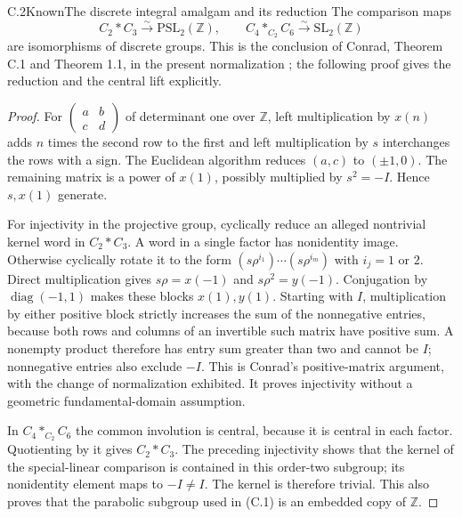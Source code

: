 \begin{statement}{C.2}{Known}{The discrete integral amalgam and its reduction}
The comparison maps
\[
 C_2*C_3\xrightarrow{\sim}\mathrm{PSL}_2(\mathbb Z),\qquad
 C_4*_{C_2}C_6\xrightarrow{\sim}\mathrm{SL}_2(\mathbb Z)
\]
are isomorphisms of discrete groups. This is the conclusion of Conrad,
Theorem C.1 and Theorem 1.1, in the present normalization
\cite{ConradSL2Z}; the following proof gives the reduction and the
central lift explicitly.
\end{statement}
\begin{proof}
For $\left(\begin{smallmatrix}a&b\\c&d\end{smallmatrix}\right)$ of
determinant one over $\mathbb Z$, left multiplication by $x(n)$ adds
$n$ times the second row to the first and left multiplication by $s$
interchanges the rows with a sign. The Euclidean algorithm reduces
$(a,c)$ to $(\pm1,0)$. The remaining matrix is a power of $x(1)$,
possibly multiplied by $s^2=-I$. Hence $s,x(1)$ generate.

For injectivity in the projective group, cyclically reduce an alleged
nontrivial kernel word in $C_2*C_3$. A word in a single factor has
nonidentity image. Otherwise cyclically rotate it to the form
$(s\rho^{i_1})\cdots(s\rho^{i_m})$ with $i_j=1$ or $2$.
Direct multiplication gives $s\rho=x(-1)$ and $s\rho^2=y(-1)$.
Conjugation by $\operatorname{diag}(-1,1)$ makes these blocks
$x(1),y(1)$. Starting with $I$, multiplication by either positive
block strictly increases the sum of the nonnegative entries, because
both rows and columns of an invertible such matrix have positive sum.
A nonempty product therefore has entry sum greater than two and
cannot be $I$; nonnegative entries also exclude $-I$.
This is Conrad's positive-matrix argument, with the change of
normalization exhibited. It proves injectivity without a geometric
fundamental-domain assumption.

In $C_4*_{C_2}C_6$ the common involution is central, because it is
central in each factor. Quotienting by it gives $C_2*C_3$. The preceding
injectivity shows that the kernel of the special-linear comparison is
contained in this order-two subgroup; its nonidentity element maps
to $-I\ne I$. The kernel is therefore trivial. This also proves that
the parabolic subgroup used in (C.1) is an embedded copy of $\mathbb Z$.
\end{proof}

